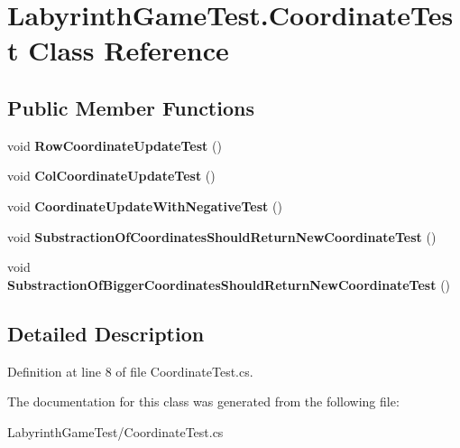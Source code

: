 \hypertarget{class_labyrinth_game_test_1_1_coordinate_test}{\section{Labyrinth\+Game\+Test.\+Coordinate\+Test Class Reference}
\label{class_labyrinth_game_test_1_1_coordinate_test}
}
\subsection*{Public Member Functions}
\begin{DoxyCompactItemize}
\item 
\hypertarget{class_labyrinth_game_test_1_1_coordinate_test_a0db2897fc8f242a3ba6f155b4374a4e1}{void {\bfseries Row\+Coordinate\+Update\+Test} ()}\label{class_labyrinth_game_test_1_1_coordinate_test_a0db2897fc8f242a3ba6f155b4374a4e1}

\item 
\hypertarget{class_labyrinth_game_test_1_1_coordinate_test_a7c280bfc815c75f41dc8eeafa18284dd}{void {\bfseries Col\+Coordinate\+Update\+Test} ()}\label{class_labyrinth_game_test_1_1_coordinate_test_a7c280bfc815c75f41dc8eeafa18284dd}

\item 
\hypertarget{class_labyrinth_game_test_1_1_coordinate_test_ab639f37f54a20e71512d00cca30ee6ee}{void {\bfseries Coordinate\+Update\+With\+Negative\+Test} ()}\label{class_labyrinth_game_test_1_1_coordinate_test_ab639f37f54a20e71512d00cca30ee6ee}

\item 
\hypertarget{class_labyrinth_game_test_1_1_coordinate_test_a094a760e28bdc165023223ae80410ffc}{void {\bfseries Substraction\+Of\+Coordinates\+Should\+Return\+New\+Coordinate\+Test} ()}\label{class_labyrinth_game_test_1_1_coordinate_test_a094a760e28bdc165023223ae80410ffc}

\item 
\hypertarget{class_labyrinth_game_test_1_1_coordinate_test_a2b36e28c7def15a0ec3bd14877fe410e}{void {\bfseries Substraction\+Of\+Bigger\+Coordinates\+Should\+Return\+New\+Coordinate\+Test} ()}\label{class_labyrinth_game_test_1_1_coordinate_test_a2b36e28c7def15a0ec3bd14877fe410e}

\end{DoxyCompactItemize}


\subsection{Detailed Description}


Definition at line 8 of file Coordinate\+Test.\+cs.



The documentation for this class was generated from the following file\+:\begin{DoxyCompactItemize}
\item 
Labyrinth\+Game\+Test/Coordinate\+Test.\+cs\end{DoxyCompactItemize}
